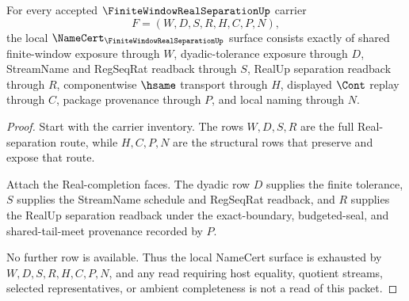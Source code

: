\begin{theorem}
\label{thm:finite-window-real-separation-namecert-surface}
For every accepted $\FiniteWindowRealSeparationUp$ carrier
$$
F=(W,D,S,R,H,C,P,N),
$$
the local $\NameCert_{\FiniteWindowRealSeparationUp}$ surface consists exactly of shared finite-window exposure through $W$, dyadic-tolerance exposure through $D$, StreamName and RegSeqRat readback through $S$, RealUp separation readback through $R$, componentwise $\hsame$ transport through $H$, displayed $\Cont$ replay through $C$, package provenance through $P$, and local naming through $N$.
\end{theorem}
\begin{proof}
Start with the carrier inventory. The rows $W,D,S,R$ are the full Real-separation route, while $H,C,P,N$ are the structural rows that preserve and expose that route.

Attach the Real-completion faces. The dyadic row $D$ supplies the finite tolerance, $S$ supplies the StreamName schedule and RegSeqRat readback, and $R$ supplies the RealUp separation readback under the exact-boundary, budgeted-seal, and shared-tail-meet provenance recorded by $P$.

No further row is available. Thus the local NameCert surface is exhausted by $W,D,S,R,H,C,P,N$, and any read requiring host equality, quotient streams, selected representatives, or ambient completeness is not a read of this packet.
\end{proof}

